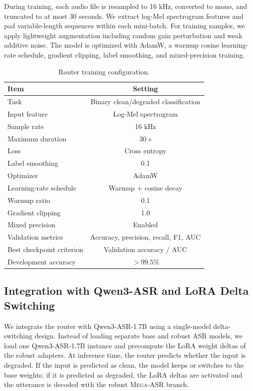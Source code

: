 \documentclass{llmxive}
\begin{document}
During training, each audio file is resampled to 16 kHz, converted to mono, and
truncated to at most 30 seconds. We extract log-Mel spectrogram features and pad
variable-length sequences within each mini-batch. For training samples, we apply
lightweight augmentation including random gain perturbation and weak additive
noise. The model is optimized with AdamW, a warmup cosine learning-rate schedule,
gradient clipping, label smoothing, and mixed-precision training.

\begin{table}[t]
\centering
\small
\begin{tabular}{lc}
\toprule
\textbf{Item} & \textbf{Setting} \\
\midrule
Task & Binary clean/degraded classification \\
Input feature & Log-Mel spectrogram \\
Sample rate & 16 kHz \\
Maximum duration & 30 s \\
Loss & Cross entropy \\
Label smoothing & 0.1 \\
Optimizer & AdamW \\
Learning-rate schedule & Warmup + cosine decay \\
Warmup ratio & 0.1 \\
Gradient clipping & 1.0 \\
Mixed precision & Enabled \\
Validation metrics & Accuracy, precision, recall, F1, AUC \\
Best checkpoint criterion & Validation accuracy / AUC \\
Development accuracy & $>99.5\%$ \\
\bottomrule
\end{tabular}
\caption{Router training configuration.}
\label{tab:router_training_config}
\end{table}

\subsection{Integration with Qwen3-ASR and LoRA Delta Switching}

We integrate the router with Qwen3-ASR-1.7B using a single-model delta-switching
design. Instead of loading separate base and robust ASR models, we load one
Qwen3-ASR-1.7B instance and precompute the LoRA weight deltas of the robust
adapters. At inference time, the router predicts whether the input is degraded.
If the input is predicted as clean, the model keeps or switches to the base
weights; if it is predicted as degraded, the LoRA deltas are activated and the
utterance is decoded with the robust \textsc{Mega-ASR} branch.
\end{document}
